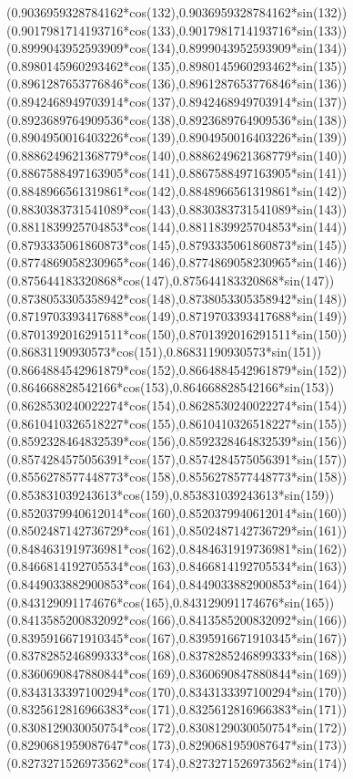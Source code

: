 {({0.9036959328784162*cos(132)},{0.9036959328784162*sin(132)})
({0.9017981714193716*cos(133)},{0.9017981714193716*sin(133)})
({0.8999043952593909*cos(134)},{0.8999043952593909*sin(134)})
({0.8980145960293462*cos(135)},{0.8980145960293462*sin(135)})
({0.8961287653776846*cos(136)},{0.8961287653776846*sin(136)})
({0.8942468949703914*cos(137)},{0.8942468949703914*sin(137)})
({0.8923689764909536*cos(138)},{0.8923689764909536*sin(138)})
({0.8904950016403226*cos(139)},{0.8904950016403226*sin(139)})
({0.8886249621368779*cos(140)},{0.8886249621368779*sin(140)})
({0.8867588497163905*cos(141)},{0.8867588497163905*sin(141)})
({0.8848966561319861*cos(142)},{0.8848966561319861*sin(142)})
({0.8830383731541089*cos(143)},{0.8830383731541089*sin(143)})
({0.8811839925704853*cos(144)},{0.8811839925704853*sin(144)})
({0.8793335061860873*cos(145)},{0.8793335061860873*sin(145)})
({0.8774869058230965*cos(146)},{0.8774869058230965*sin(146)})
({0.875644183320868*cos(147)},{0.875644183320868*sin(147)})
({0.8738053305358942*cos(148)},{0.8738053305358942*sin(148)})
({0.8719703393417688*cos(149)},{0.8719703393417688*sin(149)})
({0.8701392016291511*cos(150)},{0.8701392016291511*sin(150)})
({0.86831190930573*cos(151)},{0.86831190930573*sin(151)})
({0.8664884542961879*cos(152)},{0.8664884542961879*sin(152)})
({0.864668828542166*cos(153)},{0.864668828542166*sin(153)})
({0.8628530240022274*cos(154)},{0.8628530240022274*sin(154)})
({0.8610410326518227*cos(155)},{0.8610410326518227*sin(155)})
({0.8592328464832539*cos(156)},{0.8592328464832539*sin(156)})
({0.8574284575056391*cos(157)},{0.8574284575056391*sin(157)})
({0.8556278577448773*cos(158)},{0.8556278577448773*sin(158)})
({0.853831039243613*cos(159)},{0.853831039243613*sin(159)})
({0.8520379940612014*cos(160)},{0.8520379940612014*sin(160)})
({0.8502487142736729*cos(161)},{0.8502487142736729*sin(161)})
({0.8484631919736981*cos(162)},{0.8484631919736981*sin(162)})
({0.8466814192705534*cos(163)},{0.8466814192705534*sin(163)})
({0.8449033882900853*cos(164)},{0.8449033882900853*sin(164)})
({0.843129091174676*cos(165)},{0.843129091174676*sin(165)})
({0.8413585200832092*cos(166)},{0.8413585200832092*sin(166)})
({0.8395916671910345*cos(167)},{0.8395916671910345*sin(167)})
({0.8378285246899333*cos(168)},{0.8378285246899333*sin(168)})
({0.8360690847880844*cos(169)},{0.8360690847880844*sin(169)})
({0.8343133397100294*cos(170)},{0.8343133397100294*sin(170)})
({0.8325612816966383*cos(171)},{0.8325612816966383*sin(171)})
({0.8308129030050754*cos(172)},{0.8308129030050754*sin(172)})
({0.8290681959087647*cos(173)},{0.8290681959087647*sin(173)})
({0.8273271526973562*cos(174)},{0.8273271526973562*sin(174)})
}
